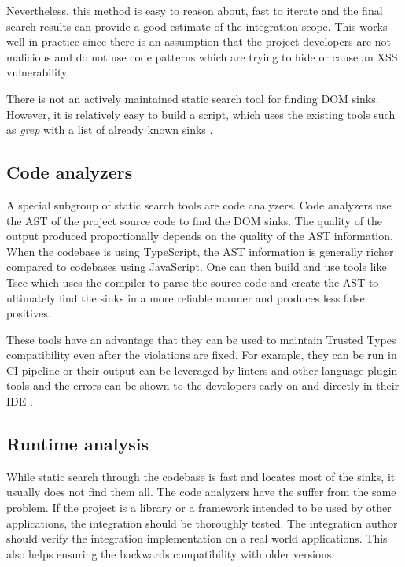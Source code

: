 Nevertheless, this method is easy to reason about, fast to iterate and the final search results can
provide a good estimate of the integration scope. This works well in practice since there is an
assumption that the project developers are not malicious and do not use code patterns which are
trying to hide or cause an XSS vulnerability.

There is not an actively maintained static search tool for finding DOM sinks. However, it is
relatively easy to build a script, which uses the existing tools such as \emph{grep} with a list
of already known sinks \cite{xss_sink_finder}.

\subsection{Code analyzers}

A special subgroup of static search tools are code analyzers. Code analyzers use the AST of the
project source code to find the DOM sinks. The quality of the output produced proportionally depends
on the quality of the AST information. When the codebase is using TypeScript, the AST information is
generally richer compared to codebases using JavaScript. One can then build and use tools like Tsec
\cite{tsec_github} which uses the compiler to parse the source code and create the AST to ultimately
find the sinks in a more reliable manner and produces less false positives.

These tools have an advantage that they can be used to maintain Trusted Types compatibility even
after the violations are fixed. For example, they can be run in CI pipeline or their output can be
leveraged by linters and other language plugin tools and the errors can be shown to the developers
early on and directly in their IDE \cite{tsec_lsp}.

\subsection{Runtime analysis}

While static search through the codebase is fast and locates most of the sinks, it usually does not
find them all. The code analyzers have the suffer from the same problem. If the project is a library
or a framework intended to be used by other applications, the integration should be thoroughly
tested. The integration author should verify the integration implementation on a real world
applications. This also helps ensuring the backwards compatibility with older versions.

